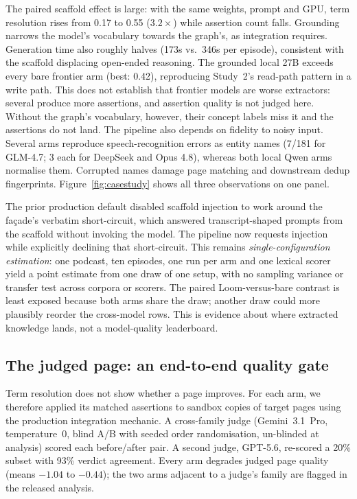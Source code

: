 \documentclass[10pt,twocolumn]{article}
\begin{document}
The paired scaffold effect is large: with the same weights, prompt and GPU, term resolution
rises from 0.17 to 0.55 ($3.2\times$) while assertion count falls. Grounding narrows the model's
vocabulary towards the graph's, as integration requires. Generation time also roughly halves
(173s vs.\ 346s per episode), consistent with the scaffold displacing open-ended reasoning.
The grounded local 27B exceeds every bare frontier arm (best: 0.42), reproducing Study~2's
read-path pattern in a write path. This does not establish that frontier models are worse
extractors: several produce more assertions, and assertion quality is not judged here. Without
the graph's vocabulary, however, their concept labels miss it and the assertions do not land.
The pipeline also depends on fidelity to noisy input. Several arms reproduce speech-recognition
errors as entity names (7/181 for GLM-4.7; 3 each for DeepSeek and Opus 4.8), whereas both local
Qwen arms normalise them. Corrupted names damage page matching and downstream dedup
fingerprints. Figure~\ref{fig:casestudy} shows all three observations on one panel.



The prior production default disabled scaffold injection to work around the fa\c{c}ade's
verbatim short-circuit, which answered transcript-shaped prompts from the scaffold without
invoking the model. The pipeline now requests injection while explicitly declining that
short-circuit. This remains \emph{single-configuration estimation}: one podcast, ten episodes,
one run per arm and one lexical scorer yield a point estimate from one draw of one setup, with
no sampling variance or transfer test across corpora or scorers. The paired Loom-versus-bare
contrast is least exposed because both arms share the draw; another draw could more plausibly
reorder the cross-model rows. This is evidence about where extracted knowledge lands, not a
model-quality leaderboard.

\subsection{The judged page: an end-to-end quality gate}\label{sec:pagejudge}
Term resolution does not show whether a page improves. For each arm, we therefore applied its
matched assertions to sandbox copies of target pages using the production integration mechanic.
A cross-family judge (Gemini~3.1~Pro, temperature~0, blind A/B with seeded order randomisation,
un-blinded at analysis) scored each before/after pair. A second judge, GPT-5.6, re-scored a
20\% subset with 93\% verdict agreement. Every arm degrades judged page quality (means $-1.04$
to $-0.44$); the two arms adjacent to a judge's family are flagged in the released analysis.
\end{document}
